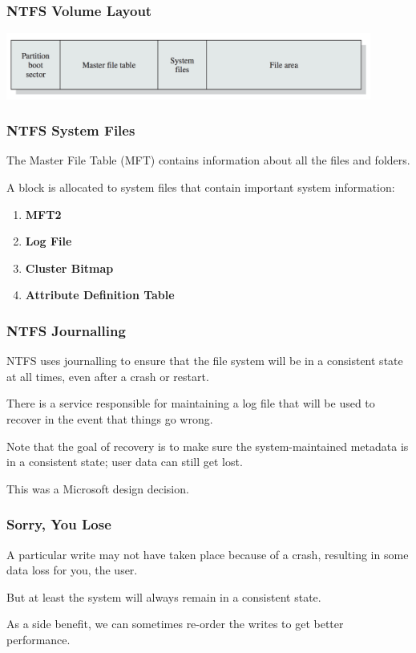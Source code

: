 \begin{frame}
	\frametitle{NTFS Volume Layout}

	\begin{center}
		\includegraphics[width=0.9\textwidth]{images/ntfs-volume.png}
	\end{center}

\end{frame}

\begin{frame}
	\frametitle{NTFS System Files}

	The Master File Table (MFT) contains information about all the files and folders.

	A block is allocated to system files that contain important system information:

	\begin{enumerate}
		\item \textbf{MFT2}
		\item \textbf{Log File}
		\item \textbf{Cluster Bitmap}
		\item \textbf{Attribute Definition Table}
	\end{enumerate}
\end{frame}


\begin{frame}
	\frametitle{NTFS Journalling}

	NTFS uses journalling to ensure that the file system will be in a consistent state at all times, even after a crash or restart.

	There is a service responsible for maintaining a log file that will be used to recover in the event that things go wrong.

	Note that the goal of recovery is to make sure the system-maintained metadata is in a consistent state; user data can still get lost.

	This was a Microsoft design decision.

\end{frame}


\begin{frame}
	\frametitle{Sorry, You Lose}

	A particular write may not have taken place because of a crash, resulting in some data loss for you, the user.

	But at least the system will always remain in a consistent state.

	As a side benefit, we can sometimes re-order the writes to get better performance.


\end{frame}



